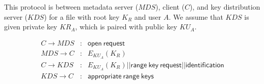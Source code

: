 \documentclass[11pt]{article}
\newcommand{\mds}{\ensuremath{\mathit{MDS}}}
\newcommand{\kds}{\ensuremath{\mathit{KDS}}}
\begin{document}
This protocol is between metadata server ($\mds$), client ($C$), and
key distribution server ($\kds$) for a file with root key $K_R$ and
user $A$.  We assume that \kds\xspace is given private key
$\textit{KR}_A$, which is paired with public key $\textit{KU}_A$.

\begin{eqnarray*}
   C \rightarrow \mds & : & \mathsf{open~request} \\
   \mds \rightarrow C & : & E_{KU_A} (K_R) \\
   C \rightarrow \kds & : & E_{KU_A} (K_R) || \mathsf{range~key~request} || \mathsf{identification} \\
   \kds \rightarrow C & : & \mathsf{appropriate~range~keys} \\
\end{eqnarray*}
\end{document}
